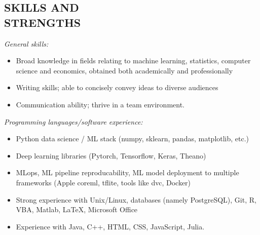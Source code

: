 \documentclass[margin]{res}
\begin{document}
\begin{resume}
		\section{SKILLS AND \\ STRENGTHS}
		{\it General skills:}\vspace{3mm}
		\begin{itemize}
			\item Broad knowledge in fields relating to machine learning, statistics, computer science and economics, obtained both academically and professionally
			\item Writing skills; able to concisely convey ideas to diverse audiences
			\item Communication ability; thrive in a team environment.
		\end{itemize}
		{\it Programming languages/software experience:}\vspace{3mm}
		\begin{itemize}
			\item Python data science / ML stack (numpy, sklearn, pandas, matplotlib, etc.)
			\item Deep learning libraries (Pytorch, Tensorflow, Keras, Theano)
			\item MLops, ML pipeline reproducability, ML model deployment to multiple frameworks (Apple coreml, tflite, tools like dvc, Docker)
			\item Strong experience with Unix/Linux, databases (namely PostgreSQL), Git, R, VBA, Matlab, \LaTeX, Microsoft Office
			\item Experience with Java, C++, HTML, CSS, JavaScript, Julia.
		\end{itemize}
		
	\end{resume}
	
\end{document}
